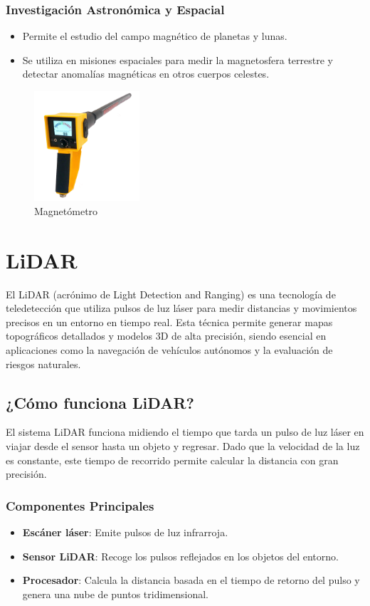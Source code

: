\documentclass{article}
\begin{document}
	\subsubsection{Investigación Astronómica y Espacial}
	\begin{itemize}
		\item Permite el estudio del campo magnético de planetas y lunas.
		\item Se utiliza en misiones espaciales para medir la magnetosfera terrestre y detectar anomalías magnéticas en otros cuerpos celestes.
	\end{itemize}
		\begin{figure}[H]
		\centering
		\includegraphics[width=0.35\textwidth]{magnetometro.png}
		\caption{Magnetómetro}
	\end{figure}
	
	
	\section{LiDAR} El LiDAR (acrónimo de Light Detection and Ranging) es una tecnología de teledetección que utiliza pulsos de luz láser para medir distancias y movimientos precisos en un entorno en tiempo real. Esta técnica permite generar mapas topográficos detallados y modelos 3D de alta precisión, siendo esencial en aplicaciones como la navegación de vehículos autónomos y la evaluación de riesgos naturales.
	\subsection{¿Cómo funciona LiDAR?}
	El sistema LiDAR funciona midiendo el tiempo que tarda un pulso de luz láser en viajar desde el sensor hasta un objeto y regresar. Dado que la velocidad de la luz es constante, este tiempo de recorrido permite calcular la distancia con gran precisión.
	
	\subsubsection{Componentes Principales}
	\begin{itemize}
		\item \textbf{Escáner láser}: Emite pulsos de luz infrarroja.
		\item \textbf{Sensor LiDAR}: Recoge los pulsos reflejados en los objetos del entorno.
		\item \textbf{Procesador}: Calcula la distancia basada en el tiempo de retorno del pulso y genera una nube de puntos tridimensional.
	\end{itemize}
	
\end{document}
